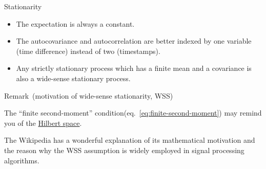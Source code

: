 \documentclass[utf-8, 10pt, aspectratio=1610]{beamer}
\begin{document}
\begin{frame}[allowframebreaks]{Stationarity}
	\framebreak
	\vspace*{\fill}
	\begin{corollary}
		\begin{itemize}
			\item The expectation is always a constant.
			\item The autocovariance and autocorrelation are better indexed by one variable (time difference) instead of two (timestamps).
			\item Any strictly stationary process which has a finite mean and a covariance is also a wide-sense stationary process.
		\end{itemize}
	\end{corollary}
	\vspace*{\fill}

	\framebreak
	\vspace*{\fill}
	\begin{block}{Remark\ (motivation of wide-sense stationarity, WSS)}
		\par The ``finite second-moment'' condition(eq.~\ref{eq:finite-second-moment}) may remind you of the \href{https://en.wikipedia.org/wiki/Hilbert_space}{Hilbert space}.
		\par The Wikipedia \cite{enwiki:1166251052} has a wonderful explanation of its mathematical motivation and the reason why the WSS assumption is widely employed in signal processing algorithms.
	\end{block}
	\vspace*{\fill}
\end{frame}
\end{document}
